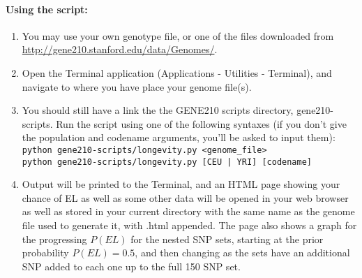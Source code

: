 \documentclass[a4paper, 12pt]{article}
\begin{document}
\paragraph{Using the script:}
\begin{enumerate}
  \item You may use your own genotype file, or one of the files downloaded from \url{http://gene210.stanford.edu/data/Genomes/}.
  \item Open the Terminal application (Applications - Utilities - Terminal), and navigate to where you have place your genome file(s).
  \item You should still have a link the the GENE210 scripts directory, gene210-scripts. 
    Run the script using one of the following syntaxes (if you don't give the population and codename arguments, you'll be asked to input them): \\
    \texttt{python gene210-scripts/longevity.py <genome\_file>} \\
    \texttt{python gene210-scripts/longevity.py [CEU | YRI] [codename]}

  \item Output will be printed to the Terminal, and an HTML page showing your chance of EL as well as some other data will be opened in your web browser as well as stored in your current directory with the same name as the genome file used to generate it, with .html appended. 
    The page also shows a graph for the progressing $P(EL)$ for the nested SNP sets, starting at the prior probability $P(EL) = 0.5$, and then changing as the sets have an additional SNP added to each one up to the full 150 SNP set.

\end{enumerate}
\end{document}
